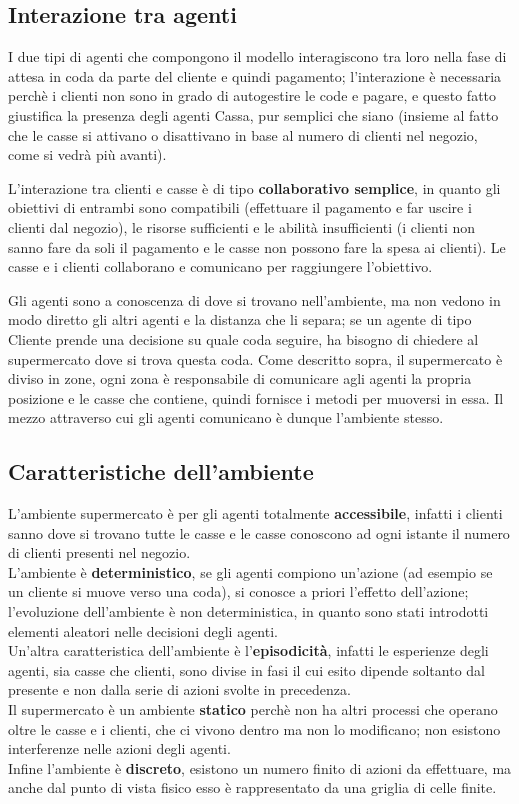 \subsection{Interazione tra agenti}

I due tipi di agenti che compongono il modello interagiscono tra loro nella fase di attesa in coda da parte del cliente e quindi pagamento; l'interazione è necessaria perchè i clienti non sono in grado di autogestire le code e pagare, e questo fatto giustifica la presenza degli agenti Cassa, pur semplici che siano (insieme al fatto che le casse si attivano o disattivano in base al numero di clienti nel negozio, come si vedrà più avanti).

L'interazione tra clienti e casse è di tipo \textbf{collaborativo semplice}, in quanto gli obiettivi di entrambi sono compatibili (effettuare il pagamento e far uscire i clienti dal negozio), le risorse sufficienti e le abilità insufficienti (i clienti non sanno fare da soli il pagamento e le casse non possono fare la spesa ai clienti). Le casse e i clienti collaborano e comunicano per raggiungere l'obiettivo.

Gli agenti sono a conoscenza di dove si trovano nell'ambiente, ma non vedono in modo diretto gli altri agenti e la distanza che li separa; se un agente di tipo Cliente prende una decisione su quale coda seguire, ha bisogno di chiedere al supermercato dove si trova questa coda. Come descritto sopra, il supermercato è diviso in zone, ogni zona è responsabile di comunicare agli agenti la propria posizione e le casse che contiene, quindi fornisce i metodi per muoversi in essa. Il mezzo attraverso cui gli agenti comunicano è dunque l'ambiente stesso.

\subsection{Caratteristiche dell'ambiente}

L'ambiente supermercato è per gli agenti totalmente \textbf{accessibile}, infatti i clienti sanno dove si trovano tutte le casse e le casse conoscono ad ogni istante il numero di clienti presenti nel negozio. \\
L'ambiente è \textbf{deterministico}, se gli agenti compiono un'azione (ad esempio se un cliente si muove verso una coda), si conosce a priori l'effetto dell'azione; l'evoluzione dell'ambiente è non deterministica, in quanto sono stati introdotti elementi aleatori nelle decisioni degli agenti. \\
Un'altra caratteristica dell'ambiente è l'\textbf{episodicità}, infatti le esperienze degli agenti, sia casse che clienti, sono divise in fasi il cui esito dipende soltanto dal presente e non dalla serie di azioni svolte in precedenza. \\
Il supermercato è un ambiente \textbf{statico} perchè non ha altri processi che operano oltre le casse e i clienti, che ci vivono dentro ma non lo modificano; non esistono interferenze nelle azioni degli agenti. \\
Infine l'ambiente è \textbf{discreto}, esistono un numero finito di azioni da effettuare, ma anche dal punto di vista fisico esso è rappresentato da una griglia di celle finite.

